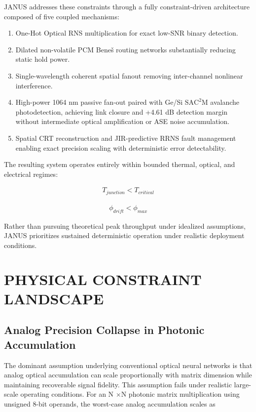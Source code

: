 \documentclass[journal]{IEEEtran}
\begin{document}
JANUS addresses these constraints through a fully constraint-driven architecture composed of five coupled mechanisms:

\begin{enumerate}
\item One-Hot Optical RNS multiplication for exact low-SNR binary detection.
\item Dilated non-volatile PCM Beneš routing networks substantially reducing static hold power.
\item Single-wavelength coherent spatial fanout removing inter-channel nonlinear interference.
\item High-power 1064 nm passive fan-out paired with Ge/Si $\mathrm{SAC^2M}$ avalanche photodetection, achieving link closure and +4.61 dB detection margin without intermediate optical amplification or ASE noise accumulation.
\item Spatial CRT reconstruction and JIR-predictive RRNS fault management enabling exact precision scaling with deterministic error detectability.
\end{enumerate}

The resulting system operates entirely within bounded thermal, optical, and electrical regimes:

\begin{center}
\end{center}

\begin{align}
\text{$T_{junction} < T_{critical}$}
\end{align}

\begin{align}
\text{$\phi_{drift} < \phi_{max}$}
\end{align}

Rather than pursuing theoretical peak throughput under idealized assumptions, JANUS prioritizes sustained deterministic operation under realistic deployment conditions.

\section{PHYSICAL CONSTRAINT LANDSCAPE}

\subsection{\textbf{Analog Precision Collapse in Photonic Accumulation}}

The dominant assumption underlying conventional optical neural networks is that analog optical accumulation can scale proportionally with matrix dimension while maintaining recoverable signal fidelity. This assumption fails under realistic large-scale operating conditions.
For an N $\times$N photonic matrix multiplication using unsigned 8-bit operands, the worst-case analog accumulation scales as
\end{document}
